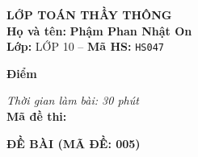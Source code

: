 \noindent
\begin{tcolorbox}[colback=white,colframe=black,arc=0mm,boxrule=0.8pt,top=4pt,bottom=4pt,left=6pt,right=6pt]
	\begin{minipage}[c]{0.44\textwidth}
		{\bfseries\large LỚP TOÁN THẦY THÔNG}\\[3pt]
		\textbf{Họ và tên:} \textbf{\large Phậm Phan Nhật On}\\[3pt]
		\textbf{Lớp:} LỚP 10 \quad -- \quad \textbf{Mã HS:} \texttt{HS047}
	\end{minipage}
	\hfill
	\begin{minipage}[c]{0.22\textwidth}
		\begin{tcolorbox}[colback=white,colframe=black,arc=0mm,boxrule=0.6pt,height=1.8cm,halign=center,valign=top,top=2pt]
			{\bfseries\normalsize Điểm}
		\end{tcolorbox}
	\end{minipage}
	\hfill
	\begin{minipage}[c]{0.30\textwidth}
		\raggedleft
		\textit{Thời gian làm bài: 30 phút}\\[4pt]
		\textbf{Mã đề thi:} 
	\end{minipage}
\end{tcolorbox}
\vspace{0.25cm}

\noindent\textbf{\large ĐỀ BÀI (MÃ ĐỀ: 005)}
\vspace{0.1cm}

